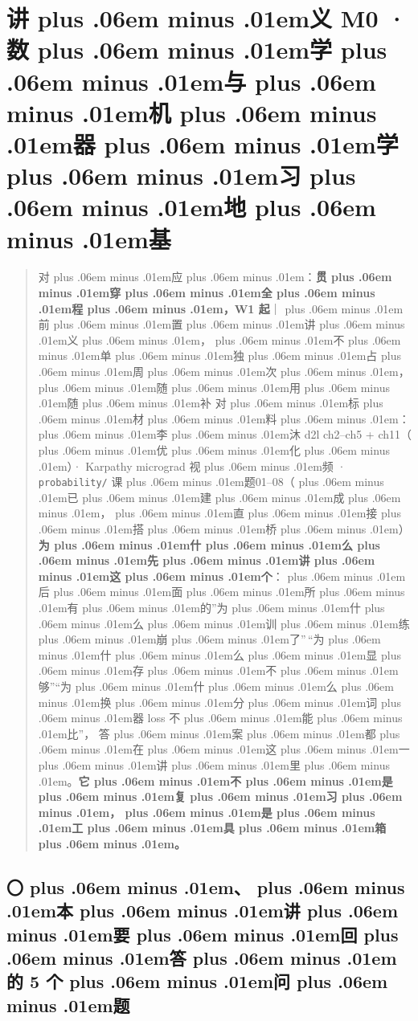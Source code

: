\documentclass[
]{article}
\newcommand{\passthrough}[1]{#1}
\def\zh#1{{\zhfont #1}}
\def\sym#1{{\symfont #1}}
\def\zhglue{\hskip0pt plus .06em minus .01em}
\begin{document}
\newpage

\section{\zh{讲\zhglue 义} M0 \sym{·} \zh{数\zhglue 学\zhglue 与\zhglue 机\zhglue 器\zhglue 学\zhglue 习\zhglue 地\zhglue 基}}\label{ux8bb2ux4e49-m0-ux6570ux5b66ux4e0eux673aux5668ux5b66ux4e60ux5730ux57fa}

\begin{quote}
\zh{对\zhglue 应\zhglue ：}\textbf{\zh{贯\zhglue 穿\zhglue 全\zhglue 程\zhglue ，}W1 \zh{起}}\zh{｜\zhglue 前\zhglue 置\zhglue 讲\zhglue 义\zhglue ，\zhglue 不\zhglue 单\zhglue 独\zhglue 占\zhglue 周\zhglue 次\zhglue ，\zhglue 随\zhglue 用\zhglue 随\zhglue 补} \zh{对\zhglue 标\zhglue 材\zhglue 料\zhglue ：\zhglue 李\zhglue 沐} d2l ch2--ch5 + ch11\zh{（\zhglue 优\zhglue 化\zhglue ）}\sym{·} Karpathy micrograd \zh{视\zhglue 频} \sym{·} \passthrough{\lstinline!probability/!} \zh{课\zhglue 题}01--08\zh{（\zhglue 已\zhglue 建\zhglue 成\zhglue ，\zhglue 直\zhglue 接\zhglue 搭\zhglue 桥\zhglue ）} \textbf{\zh{为\zhglue 什\zhglue 么\zhglue 先\zhglue 讲\zhglue 这\zhglue 个}}\zh{：\zhglue 后\zhglue 面\zhglue 所\zhglue 有\zhglue 的}''\zh{为\zhglue 什\zhglue 么\zhglue 训\zhglue 练\zhglue 崩\zhglue 了}''\,``\zh{为\zhglue 什\zhglue 么\zhglue 显\zhglue 存\zhglue 不\zhglue 够}''``\zh{为\zhglue 什\zhglue 么\zhglue 换\zhglue 分\zhglue 词\zhglue 器} loss \zh{不\zhglue 能\zhglue 比}''\zh{，} \zh{答\zhglue 案\zhglue 都\zhglue 在\zhglue 这\zhglue 一\zhglue 讲\zhglue 里\zhglue 。}\textbf{\zh{它\zhglue 不\zhglue 是\zhglue 复\zhglue 习\zhglue ，\zhglue 是\zhglue 工\zhglue 具\zhglue 箱\zhglue 。}}
\end{quote}

\subsection{\zh{〇\zhglue 、\zhglue 本\zhglue 讲\zhglue 要\zhglue 回\zhglue 答\zhglue 的} 5 \zh{个\zhglue 问\zhglue 题}}\label{ux672cux8bb2ux8981ux56deux7b54ux7684-5-ux4e2aux95eeux9898}
\end{document}
